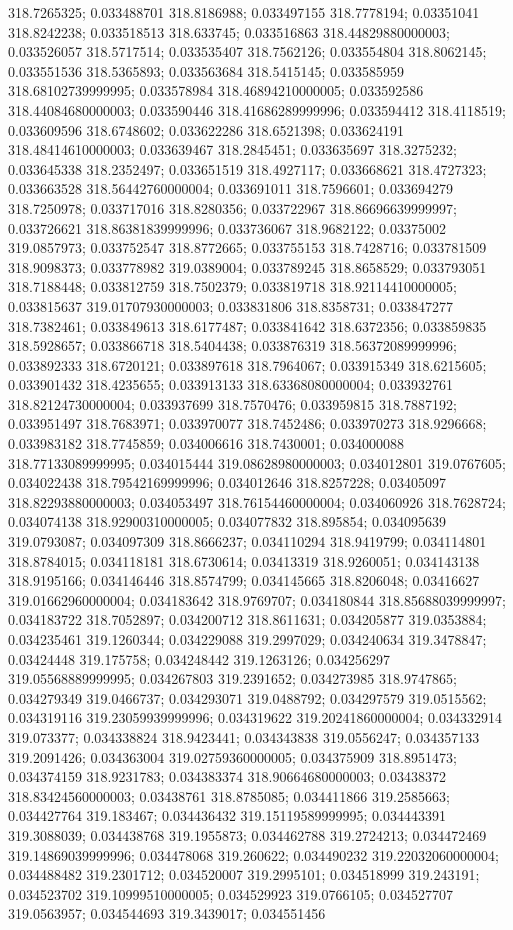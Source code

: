 318.7265325; 0.033488701 318.8186988; 0.033497155 318.7778194; 0.03351041 318.8242238; 0.033518513 318.633745; 0.033516863 318.44829880000003; 0.033526057 318.5717514; 0.033535407 318.7562126; 0.033554804 318.8062145; 0.033551536 318.5365893; 0.033563684 318.5415145; 0.033585959 318.68102739999995; 0.033578984 318.46894210000005; 0.033592586 318.44084680000003; 0.033590446 318.41686289999996; 0.033594412 318.4118519; 0.033609596 318.6748602; 0.033622286 318.6521398; 0.033624191 318.48414610000003; 0.033639467 318.2845451; 0.033635697 318.3275232; 0.033645338 318.2352497; 0.033651519 318.4927117; 0.033668621 318.4727323; 0.033663528 318.56442760000004; 0.033691011 318.7596601; 0.033694279 318.7250978; 0.033717016 318.8280356; 0.033722967 318.86696639999997; 0.033726621 318.86381839999996; 0.033736067 318.9682122; 0.03375002 319.0857973; 0.033752547 318.8772665; 0.033755153 318.7428716; 0.033781509 318.9098373; 0.033778982 319.0389004; 0.033789245 318.8658529; 0.033793051 318.7188448; 0.033812759 318.7502379; 0.033819718 318.92114410000005; 0.033815637 319.01707930000003; 0.033831806 318.8358731; 0.033847277 318.7382461; 0.033849613 318.6177487; 0.033841642 318.6372356; 0.033859835 318.5928657; 0.033866718 318.5404438; 0.033876319 318.56372089999996; 0.033892333 318.6720121; 0.033897618 318.7964067; 0.033915349 318.6215605; 0.033901432 318.4235655; 0.033913133 318.63368080000004; 0.033932761 318.82124730000004; 0.033937699 318.7570476; 0.033959815 318.7887192; 0.033951497 318.7683971; 0.033970077 318.7452486; 0.033970273 318.9296668; 0.033983182 318.7745859; 0.034006616 318.7430001; 0.034000088 318.77133089999995; 0.034015444 319.08628980000003; 0.034012801 319.0767605; 0.034022438 318.79542169999996; 0.034012646 318.8257228; 0.03405097 318.82293880000003; 0.034053497 318.76154460000004; 0.034060926 318.7628724; 0.034074138 318.92900310000005; 0.034077832 318.895854; 0.034095639 319.0793087; 0.034097309 318.8666237; 0.034110294 318.9419799; 0.034114801 318.8784015; 0.034118181 318.6730614; 0.03413319 318.9260051; 0.034143138 318.9195166; 0.034146446 318.8574799; 0.034145665 318.8206048; 0.03416627 319.01662960000004; 0.034183642 318.9769707; 0.034180844 318.85688039999997; 0.034183722 318.7052897; 0.034200712 318.8611631; 0.034205877 319.0353884; 0.034235461 319.1260344; 0.034229088 319.2997029; 0.034240634 319.3478847; 0.03424448 319.175758; 0.034248442 319.1263126; 0.034256297 319.05568889999995; 0.034267803 319.2391652; 0.034273985 318.9747865; 0.034279349 319.0466737; 0.034293071 319.0488792; 0.034297579 319.0515562; 0.034319116 319.23059939999996; 0.034319622 319.20241860000004; 0.034332914 319.073377; 0.034338824 318.9423441; 0.034343838 319.0556247; 0.034357133 319.2091426; 0.034363004 319.02759360000005; 0.034375909 318.8951473; 0.034374159 318.9231783; 0.034383374 318.90664680000003; 0.03438372 318.83424560000003; 0.03438761 318.8785085; 0.034411866 319.2585663; 0.034427764 319.183467; 0.034436432 319.15119589999995; 0.034443391 319.3088039; 0.034438768 319.1955873; 0.034462788 319.2724213; 0.034472469 319.14869039999996; 0.034478068 319.260622; 0.034490232 319.22032060000004; 0.034488482 319.2301712; 0.034520007 319.2995101; 0.034518999 319.243191; 0.034523702 319.10999510000005; 0.034529923 319.0766105; 0.034527707 319.0563957; 0.034544693 319.3439017; 0.034551456 